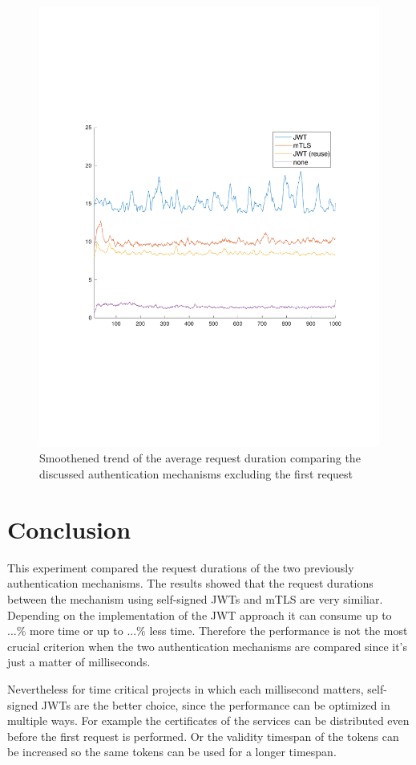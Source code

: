 \begin{figure}
	\centering
	\includegraphics[trim=0 200 0 200, clip, width=\textwidth]{images/experiment/experiment-trend.pdf}
	\caption{Smoothened trend of the average request duration comparing the discussed authentication mechanisms excluding the first request}
	\label{fig:trend}
\end{figure}

\section{Conclusion}
This experiment compared the request durations of the two previously authentication mechanisms.
The results showed that the request durations between the mechanism using self-signed JWTs and mTLS are very similiar.
Depending on the implementation of the JWT approach it can consume up to ...\% more time or up to ...\% less time.
Therefore the performance is not the most crucial criterion when the two authentication mechanisms are compared since it's just a matter of milliseconds. 

Nevertheless for time critical projects in which each millisecond matters, self-signed JWTs are the better choice, since the performance can be optimized in multiple ways.
For example the certificates of the services can be distributed even before the first request is performed.
Or the validity timespan of the tokens can be increased so the same tokens can be used for a longer timespan.

